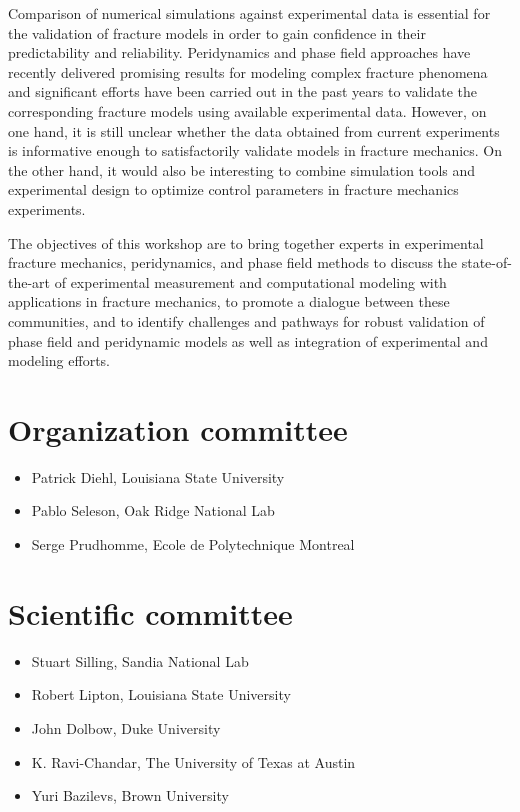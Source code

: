 Comparison of numerical simulations against experimental data is essential
for the validation of fracture models in order to gain confidence in their
predictability and reliability. Peridynamics and phase field approaches have recently
delivered promising results for modeling complex fracture phenomena and significant
efforts have been carried out in the past years to validate the corresponding
fracture models using available experimental data. However, on one hand, it is still
unclear whether the data obtained from current experiments is informative enough to
satisfactorily validate models in fracture mechanics. On the other hand, it would also be
interesting to combine simulation tools and experimental design to optimize
control parameters in fracture mechanics experiments.

The objectives of this workshop are to bring together experts in experimental fracture mechanics,
peridynamics, and phase field methods to discuss the state-of-the-art of experimental
measurement and computational modeling with applications in fracture mechanics, to promote
a dialogue between these communities, and to identify challenges and pathways for robust validation
of phase field and peridynamic models as well as integration of experimental and modeling efforts.

\section*{Organization committee }
\begin{itemize}
\item Patrick Diehl, Louisiana State University
\item Pablo Seleson, Oak Ridge National Lab
\item Serge Prudhomme, Ecole de Polytechnique Montreal
\end{itemize}

\section*{Scientific committee}
\begin{itemize}
\item Stuart Silling, Sandia National Lab
\item Robert Lipton, Louisiana State University
\item John Dolbow, Duke University
\item K. Ravi-Chandar, The University of Texas at Austin
\item Yuri Bazilevs, Brown University 
\end{itemize}
